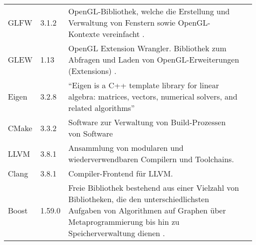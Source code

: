 \begin{longtabu}{p{0.2\textwidth}p{0.1\textwidth}p{0.6\textwidth}p{0.1\textwidth}}
    GLFW       & 3.1.2   & OpenGL-Bibliothek, welche die Erstellung und
                           Verwaltung von Fenstern sowie OpenGL-Kontexte
                           vereinfacht
                           \parencite{wikipedia_the_free_encyclopedia_glfw_2015}.
                           &\protect\footnotemark{}\\

    GLEW       & 1.13    & OpenGL Extension Wrangler. Bibliothek zum Abfragen
                           und Laden von OpenGL-Erweiterungen (Extensions)
                           \parencite{wikipedia_the_free_encyclopedia_opengl_2015-1}.  %
                           &\protect\footnotemark{}\\

    Eigen      & 3.2.8   & ``Eigen is a C++ template library for linear
                            algebra: matrices, vectors, numerical solvers, and
                            related algorithms''\parencite{benoit_jacob_eigen_2016}
                           &\protect\footnotemark{}\\

    CMake      & 3.3.2   & Software zur Verwaltung von Build-Prozessen von 
                           Software
                           &\protect\footnotemark{}\\

    LLVM       & 3.8.1   & Ansammlung von modularen und wiederverwendbaren
                           Compilern und Toolchains.
                           &\protect\footnotemark{}\\

    Clang      & 3.8.1   & Compiler-Frontend für LLVM.\@
                           &\protect\footnotemark{}\\

    Boost      & 1.59.0  & Freie Bibliothek bestehend aus einer Vielzahl von
                           Bibliotheken, die den unterschiedlichsten
                           Aufgaben von Algorithmen auf Graphen über 
                           Metaprogrammierung bis hin zu Speicherverwaltung
                           dienen
                           \parencite{wikipedia_the_free_encyclopedia_boost_2015}.
                           &\protect\footnotemark{}\\
    \bottomrule
\end{longtabu}

